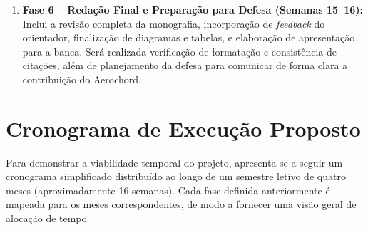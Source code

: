 \begin{enumerate}
    Com os dados coletados, realizará-se análise estatística e qualitativa, comparando métricas de desempenho com metas estabelecidas (por exemplo, latência < 30 ms). Os resultados serão discutidos em relação ao referencial teórico e às expectativas de expressividade e usabilidade. Em seguida, redigirá-se o capítulo de Resultados e Discussão, destacando aprendizados e ajustes de mapeamento derivados da avaliação.
    \item \textbf{Fase 6 – Redação Final e Preparação para Defesa (Semanas 15–16):}  
    Inclui a revisão completa da monografia, incorporação de \textit{feedback} do orientador, finalização de diagramas e tabelas, e elaboração de apresentação para a banca. Será realizada verificação de formatação e consistência de citações, além de planejamento da defesa para comunicar de forma clara a contribuição do Aerochord.
\end{enumerate}

\section{Cronograma de Execução Proposto}
\label{sec:cronograma}

Para demonstrar a viabilidade temporal do projeto, apresenta-se a seguir um cronograma simplificado distribuído ao longo de um semestre letivo de quatro meses (aproximadamente 16 semanas). Cada fase definida anteriormente é mapeada para os meses correspondentes, de modo a fornecer uma visão geral de alocação de tempo.

